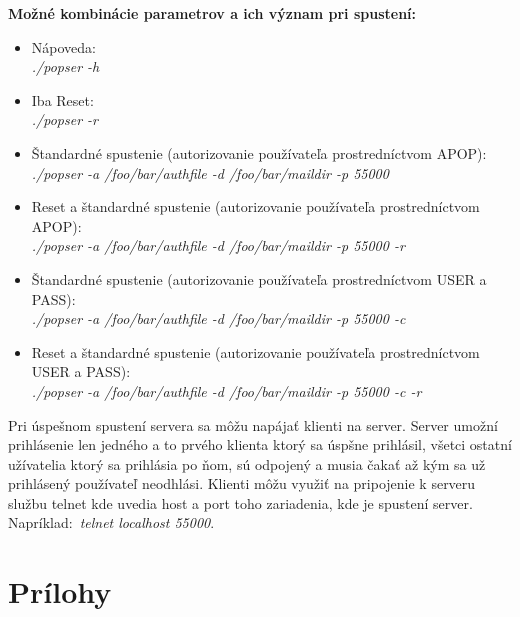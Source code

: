 \documentclass[11pt,a4paper]{article}
\begin{document}
	\textbf{Možné kombinácie parametrov a ich význam pri spustení:}
	\begin{itemize}

		\item Nápoveda:\\[0.1em]
		\textit{./popser -h}

		\item Iba Reset:\\[0.1em]
		\textit{./popser -r}

		\item Štandardné spustenie (autorizovanie používateľa prostredníctvom APOP):\\[0.1em]
		\textit{./popser -a /foo/bar/authfile -d /foo/bar/maildir -p 55000}

		\item Reset a štandardné spustenie (autorizovanie používateľa prostredníctvom APOP):\\[0.1em]
		\textit{./popser -a /foo/bar/authfile -d /foo/bar/maildir -p 55000 -r}

		\item Štandardné spustenie (autorizovanie používateľa prostredníctvom USER a PASS):\\[0.1em]
		\textit{./popser -a /foo/bar/authfile -d /foo/bar/maildir -p 55000 -c}

		\item Reset a štandardné spustenie (autorizovanie používateľa prostredníctvom USER a PASS):\\[0.1em]
		\textit{./popser -a /foo/bar/authfile -d /foo/bar/maildir -p 55000 -c -r }

	\end{itemize}

	Pri úspešnom spustení servera sa môžu napájať klienti na server. Server umožní prihlásenie len jedného a to prvého klienta ktorý sa úspšne prihlásil, všetci ostatní užívatelia ktorý sa prihlásia po ňom, sú odpojený a musia čakať až kým sa už prihlásený používateľ neodhlási. Klienti môžu využiť na pripojenie k serveru službu telnet kde uvedia host a port toho zariadenia, kde je spustení server. Napríklad: \textit{telnet localhost 55000}.

\newpage %

\section{Prílohy}
\end{document}

